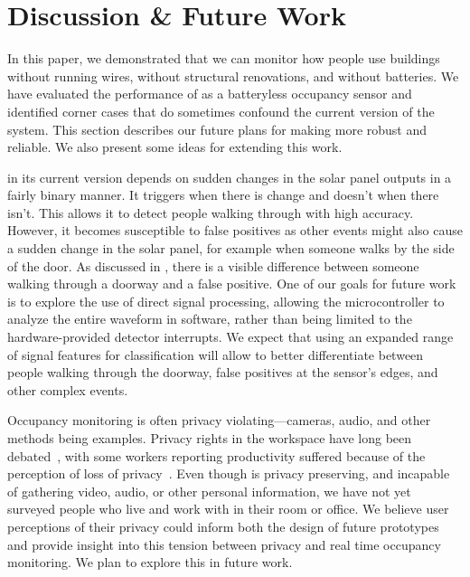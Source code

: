 \section{Discussion \& Future Work}
\label{sec:discussion}

In this paper, we demonstrated that we can monitor how people use buildings without running wires, without structural renovations, and without batteries.
We have evaluated the performance of \sysname as a batteryless occupancy sensor and identified corner cases that do sometimes confound the current version of the system.
This section describes our future plans for making \sysname more robust and reliable.
We also present some ideas for extending this work.

 \sysname in its current version depends on sudden changes in the solar panel outputs in a fairly binary manner.
It triggers when there is change and doesn't when there isn't.
This allows it to detect people walking through with high accuracy.
However, it becomes susceptible to false positives as other events might also cause a sudden change in the solar panel, for example when someone walks by the side of the door.
As discussed in , there is a visible difference between someone walking through a doorway and a false positive.
One of our goals for future work is to explore the use of direct signal processing, allowing the microcontroller to analyze the entire waveform in software, rather than being limited to the hardware-provided detector interrupts.
We expect that using an expanded range of signal features for classification will allow \sysname to better differentiate between people walking through the doorway, false positives at the sensor's edges, and other complex events.

Occupancy monitoring is often privacy violating---cameras, audio, and other methods being examples.
Privacy rights in the workspace have long been debated~\cite{oz1999electronic}, with some workers reporting productivity suffered because of the perception of loss of privacy~\cite{stanton2000electronic}.
Even though \sysname is privacy preserving, and incapable of gathering video, audio, or other personal information, we have not yet surveyed people who live and work with \sysname in their room or office.
We believe user perceptions of their privacy could inform both the design of future \sysname prototypes and provide insight into this tension between privacy and real time occupancy monitoring.
We plan to explore this in future work.


